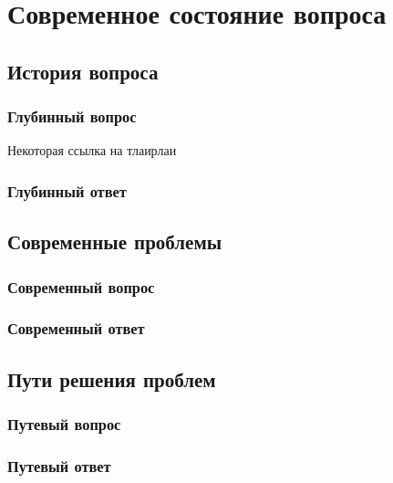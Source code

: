 \chapter{Современное состояние вопроса}
\section{История вопроса}
\subsection{Глубинный вопрос}
Некоторая \cite{elkady2012comprehensive} ссылка \cite{blasco2012multiagent} на \cite{WinNT} тлаирлаи \cite{yarp-man}
\subsection{Глубинный ответ}
\section{Современные проблемы}
\subsection{Современный вопрос}
\subsection{Современный ответ}
\section{Пути решения проблем}
\subsection{Путевый вопрос}
\subsection{Путевый ответ}